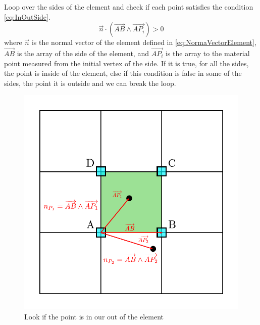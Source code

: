 \begin{enumerate}
\begin{figure}
  \end{figure}
  Loop over the sides of the element and check if each point satisfies
  the condition \eqref{eq:InOutSide}.
  \begin{equation}
    \label{eq:InOutSide}
    \overrightarrow{n} \cdot (\overrightarrow{AB} \wedge \overrightarrow{AP_i}) > 0
  \end{equation}
  where $\overrightarrow{n}$ is the normal vector of the element defined in
  \eqref{eq:NormaVectorElement}, $\overrightarrow{AB}$ is the array of
  the side of the element, and $\overrightarrow{AP_i}$ is the array to
  the material point measured from the initial vertex of the side. If
  it is true, for all the sides, the point is inside of the
  element, else if this condition is false in some of the sides,  the
  point it is outside and we can break the loop.  
  
  \begin{figure}
    \centering
    \includegraphics[scale=0.5]{./SECTIONS/TEX/ALGORITHMS/FIGURES/InOutPoint}    
    \caption{Look if the point is in our out of the element}
    \label{fig:InOutPoint}
  \end{figure}



\end{enumerate}

